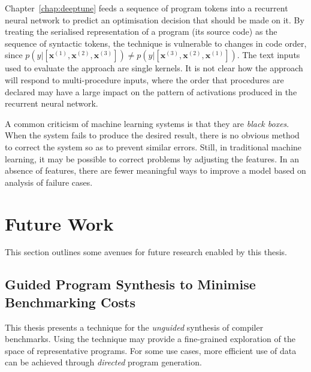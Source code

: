 Chapter~\ref{chap:deeptune} feeds a sequence of program tokens into a recurrent neural network to predict an optimisation decision that should be made on it. By treating the serialised representation of a program (its source code) as the sequence of syntactic tokens, the technique is vulnerable to changes in code order, since $p(y|[\bm{x}^{(1)}, \bm{x}^{(2)}, \bm{x}^{(3)}]) \ne p(y|[\bm{x}^{(3)}, \bm{x}^{(2)}, \bm{x}^{(1)}])$. The text inputs used to evaluate the approach are single kernels. It is not clear how the approach will respond to multi-procedure inputs, where the order that procedures are declared may have a large impact on the pattern of activations produced in the recurrent neural network.




A common criticism of machine learning systems is that they are \emph{black boxes}. When the system fails to produce the desired result, there is no obvious method to correct the system so as to prevent similar errors. Still, in traditional machine learning, it may be possible to correct problems by adjusting the features. In an absence of features, there are fewer meaningful ways to improve a model based on analysis of failure cases.


\section{Future Work}
\label{sec:conclusions-future-work}

This section outlines some avenues for future research enabled by this thesis.

\subsection{Guided Program Synthesis to Minimise Benchmarking Costs}

This thesis presents a technique for the \emph{unguided} synthesis of compiler benchmarks. Using the technique may provide a fine-grained exploration of the space of representative programs. For some use cases, more efficient use of data can be achieved through \emph{directed} program generation.


